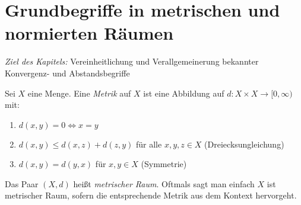 \cleardoublepage
\section{Grundbegriffe in metrischen und normierten Räumen}
\emph{Ziel des Kapitels:} Vereinheitlichung und Verallgemeinerung bekannter \\
Konvergenz- und Abstandsbegriffe

\begin{Definition}{ \label{def:metrik}
	Sei $X$ eine Menge. Eine \emph{Metrik} auf $X$ ist eine Abbildung auf 
	$d: X \times X \rightarrow [0, \infty)$ mit:
	\begin{enumerate}[label=\subscript{M}{{\arabic*}}]
		\item \label{def:metrik:1}$d(x,y) = 0 \Leftrightarrow x = y$
		\item \label{def:metrik:2}$d(x,y) \leq d(x,z) + d(z,y)$ für alle $x,y,z \in X$ \hfill (Dreiecksungleichung)
		\item \label{def:metrik:3}$d(x,y) = d(y,x)$ für $x,y \in X$ \hfill (Symmetrie)
	\end{enumerate}
	Das Paar $(X,d)$ heißt \emph{metrischer Raum}. Oftmals sagt man einfach 
	$X$ ist metrischer Raum, sofern die entsprechende Metrik aus dem Kontext 
	hervorgeht.
}\end{Definition}


